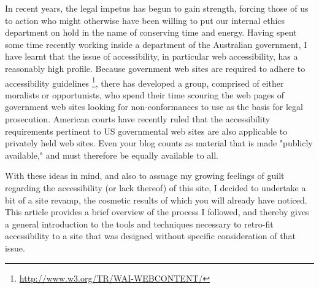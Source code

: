 \documentclass{article}
\begin{document}
In recent years, the legal impetus has begun to gain strength, forcing
those of us to action who might otherwise have been willing to put our
internal ethics department on hold in the name of conserving time and
energy. Having spent some time recently working inside a department of
the Australian government, I have learnt that the issue of
accessibility, in particular web accessibility, has a reasonably high
profile. Because government web sites are required to adhere to
accessibility guidelines \footnote{\url{http://www.w3.org/TR/WAI-WEBCONTENT/}}, there has developed a group, comprised of
either moralists or opportunists, who spend their time scouring the web
pages of government web sites looking for non-conformances to use as the
basis for legal prosecution. American courts have recently ruled that
the accessibility requirements pertinent to US governmental web sites
are also applicable to privately held web sites. Even your blog counts
as material that is made "publicly available," and must therefore be
equally available to all.

With these ideas in mind, and also to assuage my growing feelings of
guilt regarding the accessibility (or lack thereof) of this site, I
decided to undertake a bit of a site revamp, the cosmetic results of
which you will already have noticed. This article provides a brief
overview of the process I followed, and thereby gives a general
introduction to the tools and techniques necessary to retro-fit
accessibility to a site that was designed without specific consideration
of that issue.
\end{document}
